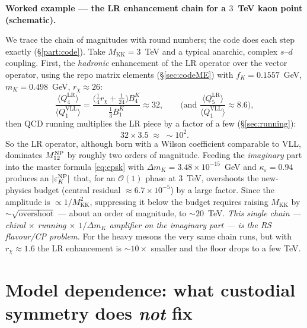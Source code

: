 \documentclass[11pt]{article}
\newenvironment{callout}[1]{%
  \par\medskip\begin{shaded}\noindent\textbf{#1}\par\smallskip}{\end{shaded}\medskip}
\newcommand{\MKK}{M_{\mathrm{KK}}}
\newcommand{\eps}{\varepsilon}
\newcommand{\Mtwelve}{M_{12}}
\newcommand{\QVLL}{Q_1^{\mathrm{VLL}}}
\newcommand{\QLRfour}{Q_4^{\mathrm{LR}}}
\newcommand{\QLRfive}{Q_5^{\mathrm{LR}}}
\theoremstyle{definition}
\begin{document}
\begin{callout}{Worked example --- the LR enhancement chain for a $3$~TeV kaon point (schematic).}
We trace the chain of magnitudes with round numbers; the code does each step
exactly (\S\ref{part:code}). Take $\MKK=3$~TeV and a typical anarchic, complex
$s$--$d$ coupling. First, the \emph{hadronic} enhancement of the LR operator over
the vector operator, using the repo matrix elements
(\S\ref{sec:codeME}) with $f_K=0.1557$~GeV, $m_K=0.498$~GeV, $r_\chi\approx26$:
\[
\frac{\langle\QLRfour\rangle}{\langle\QVLL\rangle}
= \frac{\big(\tfrac14 r_\chi+\tfrac{1}{24}\big)B_4^K}{\tfrac13 B_1^K}
\approx 32 ,
\qquad\Big(\text{and }\frac{\langle\QLRfive\rangle}{\langle\QVLL\rangle}\approx8.6\Big),
\]
then QCD running multiplies the LR piece by a factor of a few (\S\ref{sec:running}):
\[
32\times 3.5 \;\approx\; \sim 10^2 .
\]
So the LR operator, although born with a Wilson coefficient comparable to VLL,
dominates $\Mtwelve^{\rm NP}$ by roughly two orders of magnitude. Feeding the
\emph{imaginary} part into the master formula \eqref{eq:epsk} with
$\Delta m_K=3.48\times10^{-15}$~GeV and $\kappa_\eps=0.94$ produces an
$|\eps_K^{\rm NP}|$ that, for an $\mathcal{O}(1)$ phase at $3$~TeV, overshoots the
new-physics budget (central residual $\approx6.7\times10^{-5}$) by a large factor.
Since the amplitude is $\propto1/\MKK^2$, suppressing it below the budget requires
raising $\MKK$ by $\sim\sqrt{\text{overshoot}}$ --- about an order of magnitude, to
$\sim20$~TeV. \emph{This single chain --- chiral $\times$ running $\times$
$1/\Delta m_K$ amplifier on the imaginary part --- is the RS flavour/CP problem.}
For the heavy mesons the very same chain runs, but with $r_\chi\approx1.6$ the LR
enhancement is $\sim10\times$ smaller and the floor drops to a few TeV.
\end{callout}

\section{Model dependence: what custodial symmetry does \emph{not} fix}
\label{sec:custodial}
\end{document}
